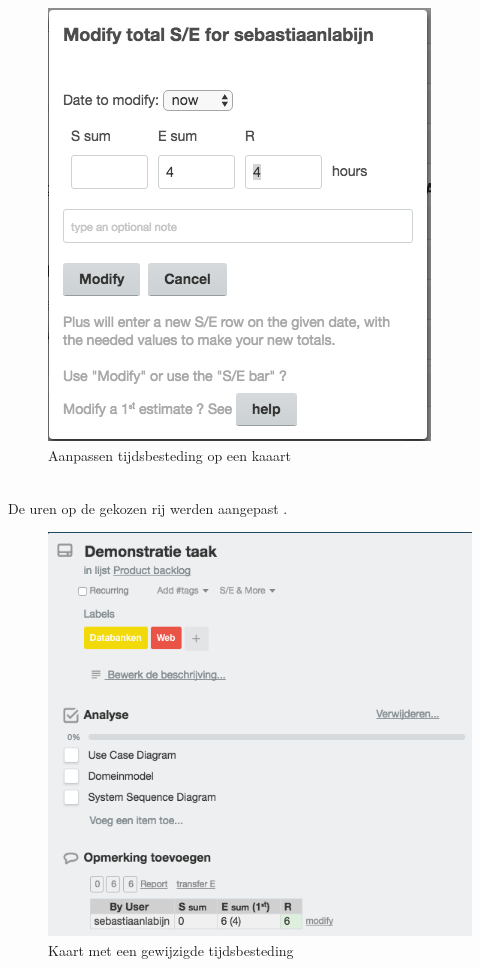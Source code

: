 \begin{figure}[H]
	\centering
	\includegraphics[scale=0.35]{./afbeeldingen/wijzigen_prestatie.png}
	\caption{Aanpassen tijdsbesteding op een kaaart}
	\label{fig:wijzigen_prestatie}	
\end{figure} 

\noindent
\\De uren op de gekozen rij werden aangepast .

\begin{figure}[h]
	\centering
	\includegraphics[scale=0.5]{./afbeeldingen/gewijzigde_prestatie.png}
	\caption{Kaart met een gewijzigde tijdsbesteding}
	\label{fig:gewijzigde_prestatie}	
\end{figure} 

